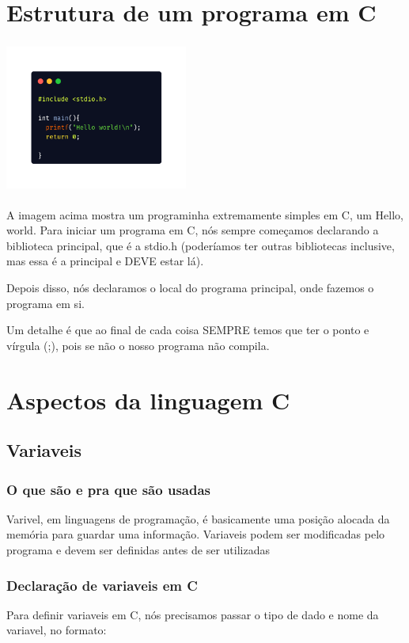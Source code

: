 \documentclass{report}
\begin{document}
	\section{Estrutura de um programa em C}
		
	\begin{center}
		\includegraphics[width=6cm,height=5cm,keepaspectratio=false]{imagens/programac.png}
	\end{center}
	
	A imagem acima mostra um programinha extremamente simples em C, um Hello, world. Para iniciar um programa em C, nós sempre começamos declarando a biblioteca principal, que é a stdio.h (poderíamos ter outras bibliotecas inclusive, mas essa é a principal e DEVE estar lá). 
	
	Depois disso, nós declaramos o local do programa principal, onde fazemos o programa em si. 
	
	Um detalhe é que ao final de cada coisa SEMPRE temos que ter o ponto e vírgula (;), pois se não o nosso programa não compila.
	
	\section{Aspectos da linguagem C}
	\subsection{Variaveis}
	\subsubsection{O que são e pra que são usadas}
	Varivel, em linguagens de programação, é basicamente uma posição alocada da memória para guardar uma informação. Variaveis podem ser modificadas pelo programa e devem ser definidas antes de ser utilizadas
	\subsubsection{Declaração de variaveis em C}
    Para definir variaveis em C, nós precisamos passar o tipo de dado e nome da variavel, no formato: 
    
\end{document}
